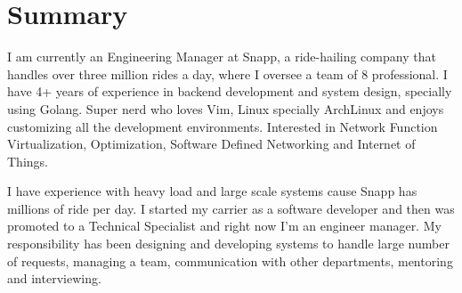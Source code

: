 \section{Summary}\closesection{}

I am currently an Engineering Manager at Snapp, a ride-hailing company that handles over three million rides a day,
where I oversee a team of 8 professional.
I have 4+ years of experience in backend development and system design,
specially using Golang.
Super nerd who loves Vim, Linux specially ArchLinux and enjoys customizing all the development environments.
Interested in Network Function Virtualization, Optimization, Software Defined Networking and Internet of Things.

I have experience with heavy load and large scale systems cause Snapp has millions of ride per day.
I started my carrier as a software developer and then was promoted to a Technical Specialist and right now I'm an engineer manager.
My responsibility has been designing and developing systems to handle
large number of requests, managing a team, communication with other departments, mentoring and interviewing.

